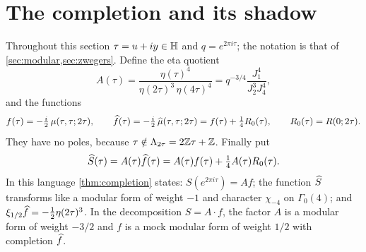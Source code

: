 \section{The completion and its shadow}\label{sec:completion}

Throughout this section $\tau=u+iy\in\mathbb{H}$ and $q=e^{2\pi i\tau}$; the notation
is that of \cref{sec:modular,sec:zwegers}. Define the eta quotient
\[
A(\tau)=\frac{\eta(\tau)^4}{\eta(2\tau)^3\,\eta(4\tau)^4}
=q^{-3/4}\frac{J_1^4}{J_2^3J_4^4},
\]
and the functions
\[
f(\tau)=-\tfrac{i}{2}\,\mu(\tau,\tau;2\tau),\qquad
\widehat{f}(\tau)=-\tfrac{i}{2}\,\widehat{\mu}(\tau,\tau;2\tau)=f(\tau)+\tfrac14R_0(\tau),\qquad
R_0(\tau)=R(0;2\tau).
\]
They have no poles, because $\tau\notin\Lambda_{2\tau}=2\mathbb{Z}\tau+\mathbb{Z}$. Finally put
\[
\widehat{S}(\tau)=A(\tau)\widehat{f}(\tau)=A(\tau)f(\tau)+\tfrac14A(\tau)R_0(\tau).
\]
In this language \cref{thm:completion} states: $S(e^{2\pi i\tau})=Af$; the
function $\widehat{S}$ transforms like a modular form of weight $-1$ and character
$\chi_{-4}$ on $\Gamma_0(4)$; and $\xi_{1/2}\widehat{f}=-\frac12\eta(2\tau)^3$. In
the decomposition $S=A\cdot f$, the factor $A$ is a modular form of weight
$-3/2$ and $f$ is a mock modular form of weight $1/2$ with completion $\widehat{f}$.

